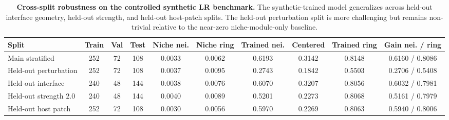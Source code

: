 \documentclass[sigconf,review,balance=false]{acmart}
\begin{document}
\begin{table}[t]
\centering
\small
\setlength{\tabcolsep}{4pt}
\renewcommand{\arraystretch}{1.08}
\caption{\textbf{Cross-split robustness on the controlled synthetic LR benchmark.}
The synthetic-trained model generalizes across held-out interface geometry, held-out
strength, and held-out host-patch splits. The held-out perturbation split is more
challenging but remains non-trivial relative to the near-zero niche-module-only baseline.}
\label{tab:synthetic_lr_cross_split}
\begin{tabular}{lccccccccc}
\toprule
Split & Train & Val & Test & Niche nei. & Niche ring & Trained nei. & Centered & Trained ring & Gain nei. / ring \\
\midrule
Main stratified & 252 & 72 & 108 & 0.0033 & 0.0062 & 0.6193 & 0.3142 & 0.8148 & 0.6160 / 0.8086 \\
Held-out perturbation & 252 & 72 & 108 & 0.0037 & 0.0095 & 0.2743 & 0.1842 & 0.5503 & 0.2706 / 0.5408 \\
Held-out interface & 240 & 48 & 144 & 0.0038 & 0.0076 & 0.6070 & 0.3207 & 0.8056 & 0.6032 / 0.7981 \\
Held-out strength $2.0$ & 240 & 48 & 144 & 0.0040 & 0.0089 & 0.5201 & 0.2273 & 0.8068 & 0.5161 / 0.7979 \\
Held-out host patch & 252 & 72 & 108 & 0.0030 & 0.0056 & 0.5970 & 0.2269 & 0.8063 & 0.5940 / 0.8006 \\
\bottomrule
\end{tabular}
\end{table}




\begin{table}[t]
\centering
\scriptsize
\setlength{\tabcolsep}{2.5pt}
\renewcommand{\arraystretch}{1.05}
\caption{\textbf{Simulator mismatch and null controls.}
The trained model transfers weakly to mismatched or null simulators, supporting the
interpretation that the main synthetic benchmark tests a specific LR-propagation
distribution rather than generic target leakage.}
\label{tab:synthetic_lr_mismatch_null}
\end{table}
\end{document}
